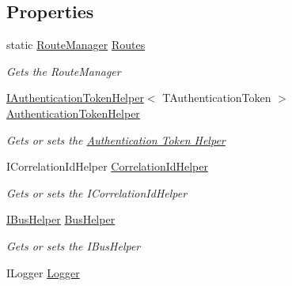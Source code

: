 \subsection*{Properties}
\begin{DoxyCompactItemize}
\item 
static \hyperlink{classCqrs_1_1Bus_1_1RouteManager}{Route\+Manager} \hyperlink{classCqrs_1_1Akka_1_1Events_1_1AkkaEventBus_a22f195a654564335ffa5f6df01b8af8d_a22f195a654564335ffa5f6df01b8af8d}{Routes}
\begin{DoxyCompactList}\small\item\em Gets the Route\+Manager \end{DoxyCompactList}\item 
\hyperlink{interfaceCqrs_1_1Authentication_1_1IAuthenticationTokenHelper}{I\+Authentication\+Token\+Helper}$<$ T\+Authentication\+Token $>$ \hyperlink{classCqrs_1_1Akka_1_1Events_1_1AkkaEventBus_a03166dfca723430ae548e833a2262632_a03166dfca723430ae548e833a2262632}{Authentication\+Token\+Helper}
\begin{DoxyCompactList}\small\item\em Gets or sets the \hyperlink{}{Authentication Token Helper} \end{DoxyCompactList}\item 
I\+Correlation\+Id\+Helper \hyperlink{classCqrs_1_1Akka_1_1Events_1_1AkkaEventBus_a5a0e9b6c2c2c5bccb917afabddbee1a8_a5a0e9b6c2c2c5bccb917afabddbee1a8}{Correlation\+Id\+Helper}
\begin{DoxyCompactList}\small\item\em Gets or sets the I\+Correlation\+Id\+Helper \end{DoxyCompactList}\item 
\hyperlink{interfaceCqrs_1_1Bus_1_1IBusHelper}{I\+Bus\+Helper} \hyperlink{classCqrs_1_1Akka_1_1Events_1_1AkkaEventBus_a04311f852422c212c4dfa35e8cc21e2e_a04311f852422c212c4dfa35e8cc21e2e}{Bus\+Helper}
\begin{DoxyCompactList}\small\item\em Gets or sets the I\+Bus\+Helper \end{DoxyCompactList}\item 
I\+Logger \hyperlink{classCqrs_1_1Akka_1_1Events_1_1AkkaEventBus_a0bbdde7f2011707581db6a66cd73c5c4_a0bbdde7f2011707581db6a66cd73c5c4}{Logger}

\end{DoxyCompactItemize}
